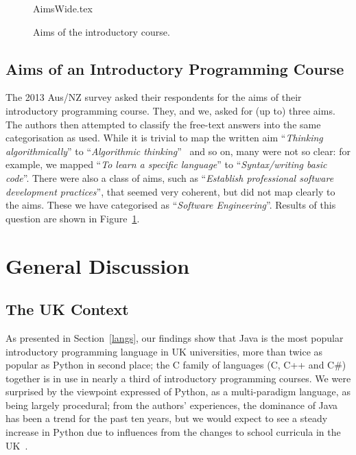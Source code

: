 \documentclass[a4paper,11pt]{article}
\begin{document}
\begin{figure}
\begin{center}
{AimsWide.tex}
\end{center}
\caption{Aims of the introductory course. \label{fig:aims}}
\end{figure}

\subsection{Aims of an Introductory Programming Course}

The 2013 Aus/NZ survey asked their respondents for the aims of their
introductory programming course. They, and we, asked for (up to) three
aims. The authors then attempted to classify the free-text answers
into the same categorisation as \cite{mason+cooper:2014} used. While
it is trivial to map the written aim ``{\emph{Thinking
algorithmically}}'' to ``{\emph{Algorithmic
thinking}}''~\cite{mason+cooper:2014} and so on, many were not so
clear: for example, we mapped ``{\emph{To learn a specific
language}}'' to ``{\emph{Syntax/writing basic code}}''. There were
also a class of aims, such as ``{\emph{Establish professional software
development practices}}'', that seemed very coherent, but did not map
clearly to the \cite{mason+cooper:2014} aims. These we have
categorised as ``{\emph{Software Engineering}}''. Results of this
question are shown in Figure~\ref{fig:aims}.

\section{General Discussion}\label{discussion}

\subsection{The UK Context}

As presented in Section~\ref{langs}, our findings show that Java is
the most popular introductory programming language in UK universities,
more than twice as popular as Python in second place; the C family of
languages (C, C++ and C\#) together is in use in nearly a third of
introductory programming courses. We were surprised by the viewpoint
expressed of Python, as a multi-paradigm language, as being largely
procedural; from the authors' experiences, the dominance of Java has
been a trend for the past ten years, but we would expect to see a
steady increase in Python due to influences from the changes to school
curricula in the UK~\cite{brown-et-al-toce2014}.
\end{document}
